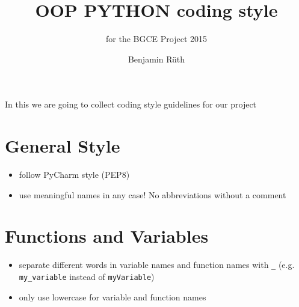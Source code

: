 \documentclass[10pt,a4paper]{scrartcl}
\title{OOP PYTHON coding style}
\author{Benjamin Rüth}
\subtitle{for the BGCE Project 2015}
\begin{document}
\maketitle
In this we are going to collect coding style guidelines for our project

\section{General Style}
\begin{itemize}
\item follow PyCharm style (PEP8)
\item use meaningful names in any case! No abbreviations without a comment
\end{itemize}

\section{Functions and Variables}
\begin{itemize}
\item separate different words in variable names and function names with \verb+_+ (e.g. \verb+my_variable+ instead of \verb+myVariable+)
\item only use lowercase for variable and function names
\end{itemize}
\end{document}
